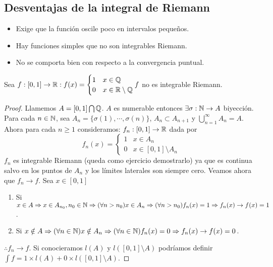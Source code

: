 \subsection{Desventajas de la integral de Riemann}
\begin{itemize}
    \item Exige que la función oscile poco en intervalos pequeños.
    \item Hay funciones simples que no son integrables Riemann.
    \item No se comporta bien con respecto a la convergencia puntual.
\end{itemize}

\begin{eg}
    Sea $f: [0, 1] \to \mathbb{R} : f(x) = \begin{cases}
            1 & x \in \mathbb{Q}              \\
            0 & x \in \mathbb{R} \setminus \mathbb{Q}
        \end{cases} f$ no es integrable Riemann.
    \begin{proof}
        Llamemos $A = [0, 1] \bigcap \mathbb{Q}$. $A$ es numerable entonces $\exists \sigma: \mathbb{N} \to A$ biyección. Para cada $n \in \mathbb{N}$, sea
        $A_n = \{ \sigma(1), \cdots, \sigma(n) \}$, $A_n \subset A_{n+1}$ y $\bigcup_{n=1}^{\infty} A_n = A$.
        Ahora para cada $n \geq 1$ consideramos:
        $f_n: [0, 1] \to \mathbb{R}$ dada por
        \begin{equation}
            f_n(x) = \begin{cases}
                1 & x \in A_n                  \\
                0 & x \in [0, 1] \setminus A_n
            \end{cases}
        \end{equation}
        $f_n$ es integrable Riemann (queda como ejercicio demostrarlo) ya que es continua salvo en los puntos de $A_n$ y
        los límites laterales son siempre cero.
        Veamos ahora que $f_n \to f$. Sea $x \in [0, 1]$ \begin{enumerate}
            \item Si $x \in A \Rightarrow x \in A_{n_0}, n_0 \in \mathbb{N} \Rightarrow (\forall n > n_0) x \in A_n \Rightarrow (\forall n > n_0) f_n(x) = 1 \Rightarrow f_n(x) \to f(x) = 1$.
            \item Si $x \notin A \Rightarrow (\forall n \in \mathbb{N}) x \notin A_n \Rightarrow (\forall n \in \mathbb{N}) f_n(x) = 0 \Rightarrow f_n(x) \to f(x) = 0$.
        \end{enumerate} $\therefore f_n \to f$.
        Si conocieramos $l(A)$ y $l([0, 1] \setminus A)$ podríamos definir $\int f = 1 \times l(A) + 0 \times l([0, 1] \setminus A)$.
    \end{proof}
\end{eg}

